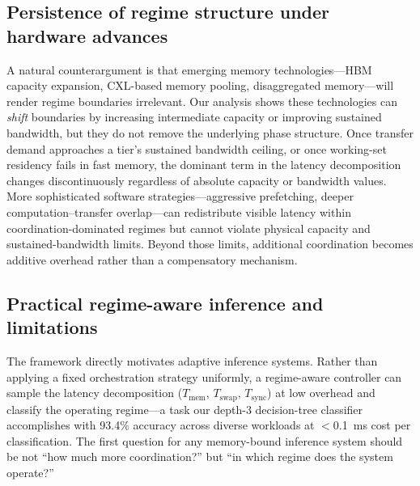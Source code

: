 \subsection{Persistence of regime structure under hardware advances}

A natural counterargument is that emerging memory technologies---HBM capacity
expansion, CXL-based memory pooling, disaggregated memory---will render regime
boundaries irrelevant.
Our analysis shows these technologies can \emph{shift} boundaries by increasing
intermediate capacity or improving sustained bandwidth, but they do not remove
the underlying phase structure.
Once transfer demand approaches a tier's sustained bandwidth ceiling, or once
working-set residency fails in fast memory, the dominant term in the latency
decomposition changes discontinuously regardless of absolute capacity or
bandwidth values.
More sophisticated software strategies---aggressive prefetching, deeper
computation--transfer overlap---can redistribute visible latency within
coordination-dominated regimes but cannot violate physical capacity and
sustained-bandwidth limits.
Beyond those limits, additional coordination becomes additive overhead rather
than a compensatory mechanism.

\subsection{Practical regime-aware inference and limitations}

The framework directly motivates adaptive inference systems.
Rather than applying a fixed orchestration strategy uniformly, a regime-aware
controller can sample the latency decomposition
($T_{\mathrm{mem}},\,T_{\mathrm{swap}},\,T_{\mathrm{sync}}$) at low overhead
and classify the operating regime---a task our depth-3 decision-tree classifier
accomplishes with 93.4\% accuracy across diverse workloads at $<$0.1~ms cost
per classification.
The first question for any memory-bound inference system should be not ``how
much more coordination?'' but ``in which regime does the system operate?''

